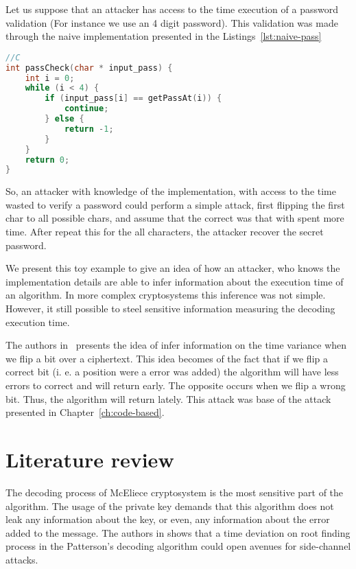 \begin{example}\label{example-timing}
Let us suppose that an attacker has access to the time execution of a password validation (For instance we use an 4 digit password). This validation was made through the naive implementation presented in the Listings~\ref{lst:naive-pass}

\begin{lstlisting}[caption={Naive implementation of password check },label={lst:naive-pass},language=C]
//C
int passCheck(char * input_pass) {
    int i = 0;
    while (i < 4) {
        if (input_pass[i] == getPassAt(i)) {
            continue;
        } else {
            return -1;
        }
    }
    return 0;
}
\end{lstlisting}
So, an attacker with knowledge of the implementation, with access to the time wasted to verify a password could perform a simple attack, first  flipping the first char to all possible chars, and assume that the correct was that with spent more time. After repeat this for the all characters, the attacker recover the secret password.
\end{example}

We present this toy example to give an idea of how an attacker, who knows the implementation details are able to infer information about the execution time of an algorithm. In more complex cryptosystems this inference was not simple. However, it still possible to steel sensitive information measuring the decoding execution time.

The authors in~\cite{shoufan2009timing} presents the idea of infer information on the time variance when we flip a bit over a ciphertext. This idea becomes of the fact that if we flip a correct bit (i. e. a position were a error was added) the algorithm will have less errors to correct and will return early. The opposite occurs when we flip a wrong bit. Thus, the algorithm will return lately. This attack was base of the attack presented in Chapter~\ref{ch:code-based}.


\section{Literature review}
The decoding process of McEliece cryptosystem is the most sensitive part of the algorithm. The usage of the private key demands that this algorithm does not leak any information about the key, or even, any information about the error added to the message. The authors in \cite{bucerzan2017improved} shows that a time deviation on root finding process in the Patterson's decoding algorithm could open avenues for side-channel attacks. 

